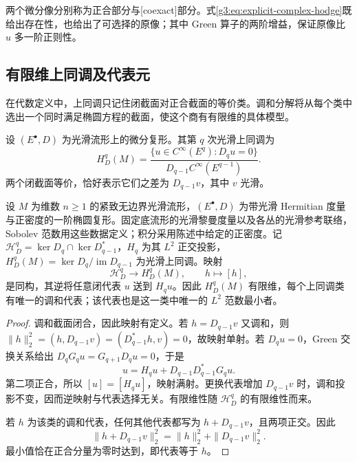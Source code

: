 两个微分像分别称为正合部分与[coexact]部分。式\eqref{g3:eq:explicit-complex-hodge}既给出存在性，也给出了可选择的原像；其中 Green 算子的两阶增益，保证原像比 \(u\) 多一阶正则性。

\subsection{有限维上同调及代表元}
\label{g3:subsec:1304:04}
在代数定义中，上同调只记住闭截面对正合截面的等价类。调和分解将从每个类中选出一个同时满足椭圆方程的截面，使这个商有有限维的具体模型。

\begin{definition}\label{g3:def:elliptic-complex-cohomology}
	设 \((E^\bullet,D)\) 为光滑流形上的微分复形。其第 \(q\) 次光滑上同调为
	\[
		H_D^q(M)=
		\frac{\{u\in C^\infty(E^q):D_qu=0\}}
		{D_{q-1}C^\infty(E^{q-1})}.
	\]
	两个闭截面等价，恰好表示它们之差为 \(D_{q-1}v\)，其中 \(v\) 光滑。
\end{definition}

\begin{theorem}\label{g3:thm:elliptic-complex-harmonic-representatives}
	设 \(M\) 为维数 \(n\ge1\) 的紧致无边界光滑流形，\((E^\bullet,D)\) 为带光滑 Hermitian 度量与正密度的一阶椭圆复形。固定底流形的光滑黎曼度量以及各丛的光滑参考联络，Sobolev 范数用这些数据定义；积分采用陈述中给定的正密度。记 \(\mathcal H_D^q=\ker D_q\cap\ker D_{q-1}^*\)，\(H_q\) 为其 \(L^2\) 正交投影，\(H_D^q(M)=\ker D_q/\operatorname{im}D_{q-1}\) 为光滑上同调。映射
	\[
		\mathcal H_D^q\longrightarrow H_D^q(M),\qquad h\longmapsto[h],
	\]
	是同构，其逆将任意闭代表 \(u\) 送到 \(H_qu\)。因此 \(H_D^q(M)\) 有限维，每个上同调类有唯一的调和代表；该代表也是这一类中唯一的 \(L^2\) 范数最小者。
\end{theorem}
\begin{proof}
	调和截面闭合，因此映射有定义。若 \(h=D_{q-1}v\) 又调和，则
	\(\|h\|_2^2=(h,D_{q-1}v)=(D_{q-1}^*h,v)=0\)，故映射单射。若 \(D_qu=0\)，Green 交换关系给出 \(D_qG_qu=G_{q+1}D_qu=0\)，于是
	\[
		u=H_qu+D_{q-1}D_{q-1}^*G_qu.
	\]
	第二项正合，所以 \([u]=[H_qu]\)，映射满射。更换代表增加 \(D_{q-1}v\) 时，调和投影不变，因而逆映射与代表选择无关。有限维性随 \(\mathcal H_D^q\) 的有限维性而来。

	若 \(h\) 为该类的调和代表，任何其他代表都写为 \(h+D_{q-1}v\)，且两项正交。因此
	\[
		\|h+D_{q-1}v\|_2^2=\|h\|_2^2+\|D_{q-1}v\|_2^2.
	\]
	最小值恰在正合分量为零时达到，即代表等于 \(h\)。
\end{proof}

